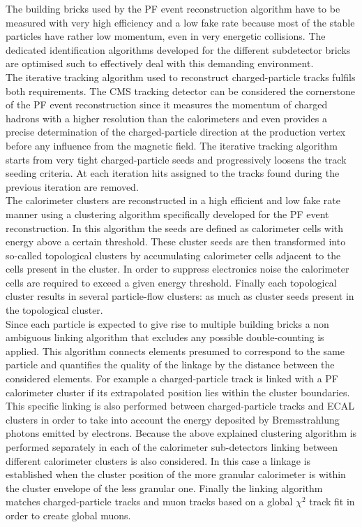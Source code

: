 The building bricks used by the PF event reconstruction algorithm have to be measured with very high efficiency and a low fake rate because most of the stable particles have rather low momentum, even in very energetic collisions.
The dedicated identification algorithms developed for the different subdetector bricks are optimised such to effectively deal with this demanding environment.
\\
The iterative tracking algorithm used to reconstruct charged-particle tracks fulfils both requirements. The CMS tracking detector can be considered the cornerstone of the PF event reconstruction since it measures the momentum of charged hadrons with a higher resolution than the calorimeters and even provides a precise determination of the charged-particle direction at the production vertex before any influence from the magnetic field. The iterative tracking algorithm starts from very tight charged-particle seeds and progressively loosens the track seeding criteria. At each iteration hits assigned to the tracks found during the previous iteration are removed.%
\\
The calorimeter clusters are reconstructed in a high efficient and low fake rate manner using a clustering algorithm specifically developed for the PF event reconstruction. In this algorithm the seeds are defined as calorimeter cells with energy above a certain threshold. These cluster seeds are then transformed into so-called topological clusters by accumulating calorimeter cells adjacent to the cells present in the cluster. In order to suppress electronics noise the calorimeter cells are required to exceed a given energy threshold. Finally each topological cluster results in several particle-flow clusters: as much as cluster seeds present in the topological cluster.
\\

Since each particle is expected to give rise to multiple building bricks a non ambiguous linking algorithm that excludes any possible double-counting is applied. This algorithm connects elements presumed to correspond to the same particle and quantifies the quality of the linkage by the distance between the considered elements. For example a charged-particle track is linked with a PF calorimeter cluster if its extrapolated position lies within the cluster boundaries. This specific linking is also performed between charged-particle tracks and ECAL clusters in order to take into account the energy deposited by Bremsstrahlung photons emitted by electrons. Because the above explained clustering algorithm is performed separately in each of the calorimeter sub-detectors linking between different calorimeter clusters is also considered. In this case a linkage is established when the cluster position of the more granular calorimeter is within the cluster envelope of the less granular one. Finally the linking algorithm matches charged-particle tracks and muon tracks based on a global $\chi^{2}$ track fit in order to create global muons. %

